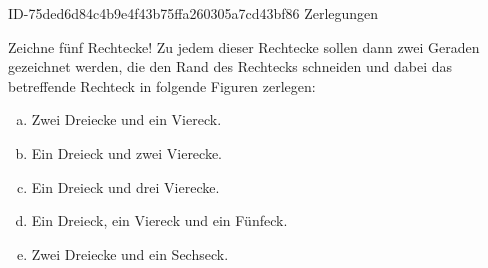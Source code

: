\begin{exercise}
      {ID-75ded6d84c4b9e4f43b75ffa260305a7cd43bf86}
      {Zerlegungen}
  \ifproblem\problem\par
    Zeichne fünf Rechtecke! Zu jedem dieser Rechtecke sollen dann zwei Geraden
    gezeichnet werden, die den Rand des Rechtecks schneiden und dabei das
    betreffende Rechteck in folgende Figuren zerlegen:
    \begin{enumerate}[a)]
      \squeeze
      \item Zwei Dreiecke und ein Viereck.
      \item Ein Dreieck und zwei Vierecke.
      \item Ein Dreieck und drei Vierecke.
      \item Ein Dreieck, ein Viereck und ein Fünfeck.
      \item Zwei Dreiecke und ein Sechseck.
    \end{enumerate}
  \fi
\end{exercise}
